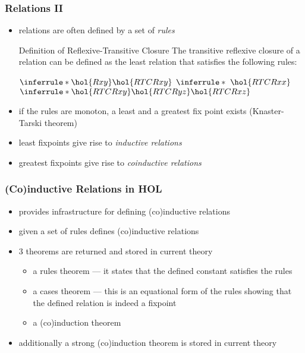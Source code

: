 \begin{frame}
\frametitle{Relations II}

\begin{itemize}
\item relations are often defined by a set of \emph{rules}
\begin{minipage}{.9\textwidth}
\begin{exampleblock}{Definition of Reflexive-Transitive Closure}
The transitive reflexive closure of a relation  can
be defined as the least relation  that satisfies the following rules:
\bigskip 
\begin{center}
$\inferrule*{\hol{R x y}}{\hol{RTC R x y}}$\quad
$\inferrule*{\ }{\hol{RTC R x x}}$\quad
$\inferrule*{\hol{RTC R x y}\\\hol{RTC R y z}}{\hol{RTC R x z}}$
\end{center}
\end{exampleblock}
\end{minipage}
\item if the rules are monoton, a least and a greatest fix point exists (Knaster-Tarski theorem)
\item least fixpoints give rise to \emph{inductive relations}
\item greatest fixpoints give rise to \emph{coinductive relations}
\end{itemize}
\end{frame}

\begin{frame}
\frametitle{(Co)inductive Relations in HOL}
\begin{itemize}
\item {} provides infrastructure for defining (co)inductive relations
\item given a set of rules  defines (co)inductive relations
\item 3 theorems are returned and stored in current theory
\begin{itemize}
\item a rules theorem --- it states that the defined constant satisfies the rules
\item a cases theorem --- this is an equational form of the rules showing that the defined relation is indeed a fixpoint
\item a (co)induction theorem
\end{itemize}
\item additionally a strong (co)induction theorem is stored in current theory
\end{itemize}
\end{frame}


